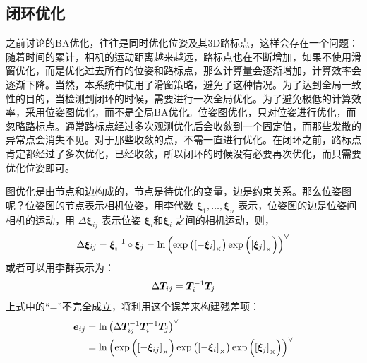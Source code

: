 \subsection{闭环优化}
之前讨论的BA优化，往往是同时优化位姿及其3D路标点，这样会存在一个问题：随着时间的累计，相机的运动距离越来越远，路标点也在不断增加，如果不使用滑窗优化，而是优化过去所有的位姿和路标点，那么计算量会逐渐增加，计算效率会逐渐下降。当然，本系统中使用了滑窗策略，避免了这种情况。为了达到全局一致性的目的，当检测到闭环的时候，需要进行一次全局优化。为了避免极低的计算效率，采用位姿图优化，而不是全局BA优化。位姿图优化，只对位姿进行优化，而忽略路标点。通常路标点经过多次观测优化后会收敛到一个固定值，而那些发散的异常点会消失不见。对于那些收敛的点，不需一直进行优化。在闭环之前，路标点肯定都经过了多次优化，已经收敛，所以闭环的时候没有必要再次优化，而只需要优化位姿即可。

图优化是由节点和边构成的，节点是待优化的变量，边是约束关系。那么位姿图呢？位姿图的节点表示相机位姿，用李代数 $ \bm{ \xi}_{1}, {\ldots}, \bm{\xi}_{n} $ 表示，位姿图的边是位姿间相机的运动，用 $\Delta \boldsymbol{\xi}_{i j} $ 表示位姿 $\bm{\xi}_{i} $和$\bm{\xi}_{i} $ 之间的相机运动，则，
\begin{equation}
\label{eqn:4.35}
\setlength{\abovedisplayskip}{6pt}
\setlength{\belowdisplayskip}{6pt}
\Delta \boldsymbol{\xi}_{i j}=\boldsymbol{\xi}_{i}^{-1} \circ \boldsymbol{\xi}_{j}=\ln \left(\exp \left(\left[-\boldsymbol{\xi}_{i}\right]_\times \right) \exp \left(\left[\boldsymbol{\xi}_{j}\right]_\times\right)\right)^{\vee}
\end{equation}
或者可以用李群表示为：
\begin{equation}
\label{eqn:4.36}
\setlength{\abovedisplayskip}{6pt}
\setlength{\belowdisplayskip}{6pt}
\Delta \boldsymbol{T}_{i j}=\boldsymbol{T}_{i}^{-1} \boldsymbol{T}_{j}
\end{equation}
上式中的“=”不完全成立，将利用这个误差来构建残差项：
\begin{equation}
\label{eqn:4.37}
\setlength{\abovedisplayskip}{6pt}
\setlength{\belowdisplayskip}{6pt}
\begin{aligned} 
	\boldsymbol{e}_{i j} &=\ln \left(\Delta \boldsymbol{T}_{i j}^{-1} \boldsymbol{T}_{i}^{-1} \boldsymbol{T}_{j}\right)^{\vee} \\ 
	&=\ln \left( \exp \left(\left[-\boldsymbol{\xi}_{i j}\right]_\times \right) \exp \left(\left[-\boldsymbol{\xi}_{i}\right]_\times\right) \exp \left( \left[\boldsymbol{\xi}_{j}\right]_\times \right)\right)^{\vee} 
\end{aligned}
\end{equation}

